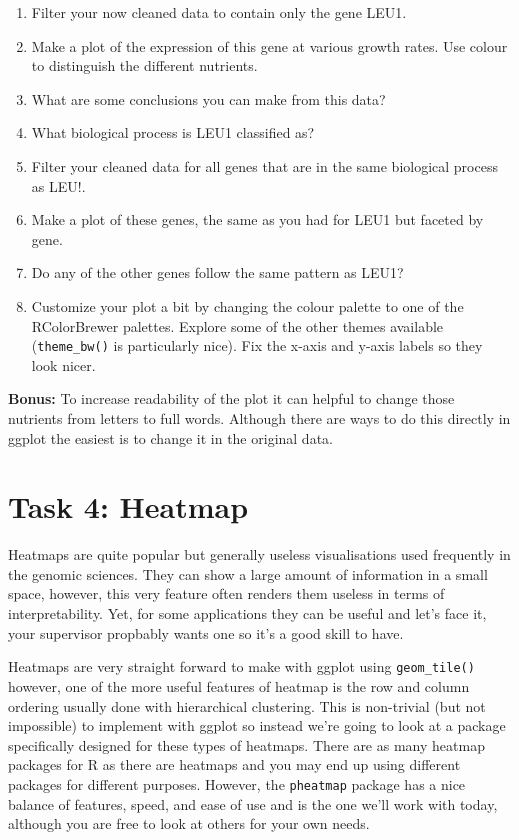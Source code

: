 \documentclass[
]{book}
\providecommand{\tightlist}{%
  \setlength{\itemsep}{0pt}\setlength{\parskip}{0pt}}
\begin{document}
\begin{enumerate}
\def\labelenumi{\arabic{enumi}.}
\tightlist
\item
  Filter your now cleaned data to contain only the gene LEU1.
\item
  Make a plot of the expression of this gene at various growth rates. Use colour to distinguish the different nutrients.
\item
  What are some conclusions you can make from this data?
\item
  What biological process is LEU1 classified as?
\item
  Filter your cleaned data for all genes that are in the same biological process as LEU!.
\item
  Make a plot of these genes, the same as you had for LEU1 but faceted by gene.
\item
  Do any of the other genes follow the same pattern as LEU1?\\
\item
  Customize your plot a bit by changing the colour palette to one of the RColorBrewer palettes. Explore some of the other themes available (\texttt{theme\_bw()} is particularly nice). Fix the x-axis and y-axis labels so they look nicer.
\end{enumerate}

\textbf{Bonus:} To increase readability of the plot it can helpful to change those nutrients from letters to full words. Although there are ways to do this directly in ggplot the easiest is to change it in the original data.

\hypertarget{task-4-heatmap}{%
\section*{Task 4: Heatmap}\label{task-4-heatmap}}

Heatmaps are quite popular but generally useless visualisations used frequently in the genomic sciences. They can show a large amount of information in a small space, however, this very feature often renders them useless in terms of interpretability. Yet, for some applications they can be useful and let's face it, your supervisor propbably wants one so it's a good skill to have.

Heatmaps are very straight forward to make with ggplot using \texttt{geom\_tile()} however, one of the more useful features of heatmap is the row and column ordering usually done with hierarchical clustering. This is non-trivial (but not impossible) to implement with ggplot so instead we're going to look at a package specifically designed for these types of heatmaps. There are as many heatmap packages for R as there are heatmaps and you may end up using different packages for different purposes. However, the \texttt{pheatmap} package has a nice balance of features, speed, and ease of use and is the one we'll work with today, although you are free to look at others for your own needs.
\end{document}
